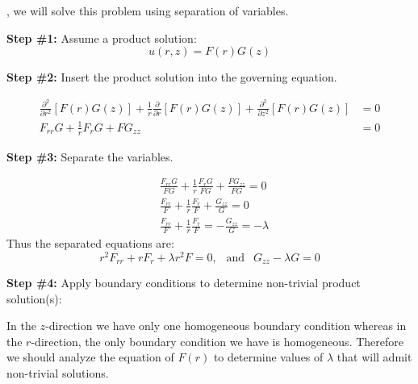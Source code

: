 , we will solve this problem using separation of variables.

\vspace{0.25cm}

\noindent\textbf{Step \#1:} Assume a product solution:
\begin{equation*}
u(r,z) = F(r)G(z)
\end{equation*}

\vspace{5.0cm}

\noindent\textbf{Step \#2:} Insert the product solution into the governing equation.

\begin{align*}
\frac{\partial^2}{\partial r^2}\left[F(r)G(z) \right] + \frac{1}{r}\frac{\partial}{\partial r}\left[F(r) G(z)\right] + \frac{\partial^2}{\partial z^2}\left[ F(r)G(z)\right] &= 0 \\
F_{rr}G + \frac{1}{r}F_rG + FG_{zz} &= 0
\end{align*}

\vspace{0.15cm}

\noindent\textbf{Step \#3:} Separate the variables.

\begin{align*}
&\frac{F_{rr}G}{FG} + \frac{1}{r}\frac{F_r G}{FG} + \frac{FG_{zz}}{FG} = 0 \\
&\frac{F_{rr}}{F} + \frac{1}{r}\frac{F_r}{F} + \frac{G_{zz}}{G} = 0 \\
&\frac{F_{rr}}{F} + \frac{1}{r}\frac{F_r}{F} = -\frac{G_{zz}}{G} = -\lambda
\end{align*}
Thus the separated equations are:
\begin{equation*}
r^2F_{rr} + rF_r + \lambda r^2 F = 0, \ \ \text{ and } \ \ G_{zz} - \lambda G = 0
\end{equation*}

\noindent\textbf{Step \#4:} Apply boundary conditions to determine non-trivial product solution(s):

\vspace{0.05cm}

\noindent In the $z$-direction we have only one homogeneous boundary condition whereas in the $r$-direction, the only boundary condition we have is homogeneous.  Therefore we should analyze the equation of $F(r)$ to determine values of $\lambda$ that will admit non-trivial solutions.


